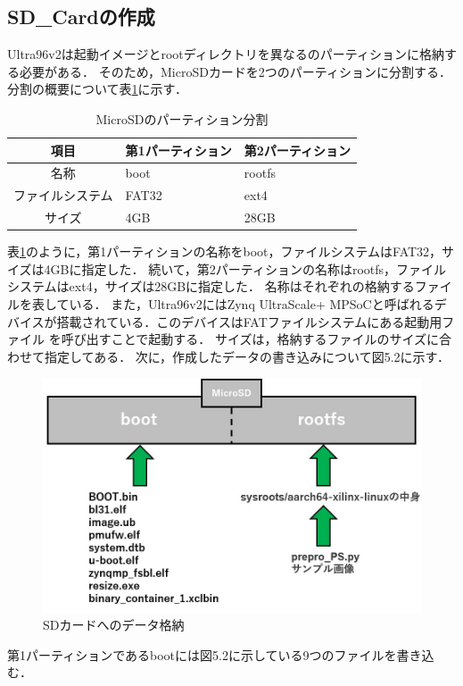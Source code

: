 \documentclass[11pt,a4j]{jreport}
\begin{document}
\subsection{SD_Cardの作成}
Ultra96v2は起動イメージとrootディレクトリを異なるのパーティションに格納する必要がある．
そのため，MicroSDカードを2つのパーティションに分割する．分割の概要について表\ref{SDpartition}に示す．
\begin{table}[H]
  \caption{MicroSDのパーティション分割}
  \label{SDpartition}
  \centering
  \begin{tabular}{|c|l|l|}
    \hline
    項目 & 第1パーティション & 第2パーティション \\
    \hline \hline
    名称 & boot & rootfs \\
    ファイルシステム & FAT32 & ext4 \\
    サイズ & 4GB & 28GB \\
    \hline
    \end{tabular}
\end{table}
表\ref{SDpartition}のように，第1パーティションの名称をboot，ファイルシステムはFAT32，サイズは4GBに指定した．
続いて，第2パーティションの名称はrootfs，ファイルシステムはext4，サイズは28GBに指定した．
名称はそれぞれの格納するファイルを表している．
また，Ultra96v2にはZynq UltraScale+ MPSoCと呼ばれるデバイスが搭載されている．このデバイスはFATファイルシステムにある起動用ファイル
を呼び出すことで起動する．
サイズは，格納するファイルのサイズに合わせて指定してある．
次に，作成したデータの書き込みについて図5.2に示す．
\begin{figure}[H]
  \center
  \includegraphics[scale = 0.7]{pict/pict6.jpg}
  \caption{SDカードへのデータ格納}
\end{figure}
第1パーティションであるbootには図5.2に示している9つのファイルを書き込む．
\end{document}
